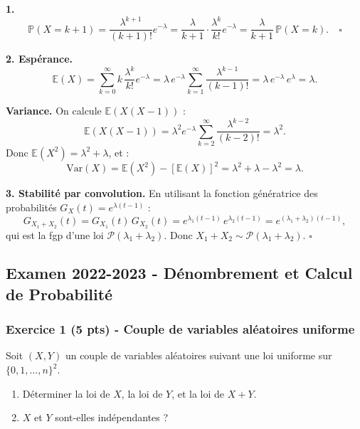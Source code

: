 \documentclass[12pt,a4paper]{article}
\begin{document}
\begin{boitecorrige}
\textbf{1.}
\[
\mathbb{P}(X=k+1) = \frac{\lambda^{k+1}}{(k+1)!}e^{-\lambda}
= \frac{\lambda}{k+1}\cdot\frac{\lambda^k}{k!}e^{-\lambda}
= \frac{\lambda}{k+1}\,\mathbb{P}(X=k). \quad \square
\]

\textbf{2. Espérance.}
\[
\mathbb{E}(X) = \sum_{k=0}^{\infty} k\,\frac{\lambda^k}{k!}e^{-\lambda}
= \lambda\,e^{-\lambda}\sum_{k=1}^{\infty}\frac{\lambda^{k-1}}{(k-1)!}
= \lambda\,e^{-\lambda}\,e^{\lambda} = \boxed{\lambda}.
\]

\textbf{Variance.} On calcule $\mathbb{E}(X(X-1))$ :
\[
\mathbb{E}(X(X-1)) = \lambda^2 e^{-\lambda}\sum_{k=2}^{\infty}\frac{\lambda^{k-2}}{(k-2)!} = \lambda^2.
\]
Donc $\mathbb{E}(X^2) = \lambda^2+\lambda$, et :
\[
\mathrm{Var}(X) = \mathbb{E}(X^2)-[\mathbb{E}(X)]^2 = \lambda^2+\lambda-\lambda^2 = \boxed{\lambda}.
\]

\textbf{3. Stabilité par convolution.}
En utilisant la fonction génératrice des probabilités $G_X(t) = e^{\lambda(t-1)}$ :
\[
G_{X_1+X_2}(t) = G_{X_1}(t)\,G_{X_2}(t) = e^{\lambda_1(t-1)}\,e^{\lambda_2(t-1)}
= e^{(\lambda_1+\lambda_2)(t-1)},
\]
qui est la fgp d'une loi $\mathcal{P}(\lambda_1+\lambda_2)$. Donc $X_1+X_2\sim\mathcal{P}(\lambda_1+\lambda_2)$. $\square$
\end{boitecorrige}

\newpage
\subsection*{Examen 2022-2023 - Dénombrement et Calcul de Probabilité}

\subsubsection*{Exercice 1 (5 pts) - Couple de variables aléatoires uniforme \niveau{\moyen}}

\begin{boiteexercice}
Soit $(X,Y)$ un couple de variables aléatoires suivant une loi uniforme sur $\{0,1,\ldots,n\}^2$.
\begin{enumerate}
  \item Déterminer la loi de $X$, la loi de $Y$, et la loi de $X+Y$.
  \item $X$ et $Y$ sont-elles indépendantes ?
\end{enumerate}
\end{boiteexercice}
\end{document}
